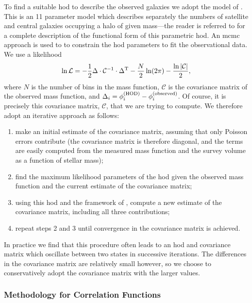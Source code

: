 To find a suitable \gls{hod} to describe the observed galaxies we adopt the model of \cite{behroozi_comprehensive_2010}. This is an 11 parameter model which describes separately the numbers of satellite and central galaxies occupying a halo of given mass---the reader is referred to \cite{behroozi_comprehensive_2010} for a complete description of the functional form of this parametric \gls{hod}. An \gls{mcmc} approach is used to to constrain the \gls{hod} parameters to fit the observational data. We use a likelihood
\begin{equation}
 \ln \mathcal{L} = -{1\over 2} \Delta\cdot \mathcal{C}^{-1}\cdot \Delta^{\rm T} - {N \over 2} \ln(2\pi) - {\ln |\mathcal{C}| \over 2},
\end{equation}
where $N$ is the number of bins in the mass function, $\mathcal{C}$ is the covariance matrix of the observed mass function, and $\Delta_i = \phi_i^{\rm (HOD)} - \phi_i^{\rm (observed)}$. Of course, it is precisely this covariance matrix, $\mathcal{C}$, that we are trying to compute. We therefore adopt an iterative approach as follows:
\begin{enumerate}
 \item make an initial estimate of the covariance matrix, assuming that only Poisson errors contribute (the covariance matrix is therefore diagonal, and the terms are easily computed from the measured mass function and the survey volume as a function of stellar mass);
 \item find the maximum likelihood parameters of the \gls{hod} given the observed mass function and the current estimate of the covariance matrix;
 \item using this \gls{hod} and the framework of \cite{smith_how_2012}, compute a new estimate of the covariance matrix, including all three contributions;
 \item repeat steps 2 and 3 until convergence in the covariance matrix is achieved.
\end{enumerate}
In practice we find that this procedure often leads to an \gls{hod} and covariance matrix which oscillate between two states in successive iterations. The differences in the covariance matrix are relatively small however, so we choose to conservatively adopt the covariance matrix with the larger values.

\subsubsection{Methodology for Correlation Functions}

